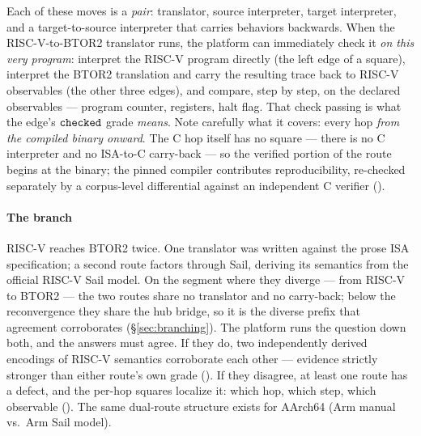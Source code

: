 Each of these moves is a \emph{pair}: translator, source interpreter,
target interpreter, and a target-to-source interpreter that carries
behaviors backwards. When the RISC-V-to-BTOR2 translator runs, the
platform can immediately check it \emph{on this very program}: interpret
the RISC-V program directly (the left edge of a square), interpret the
BTOR2 translation and carry the resulting trace back to RISC-V
observables (the other three edges), and compare, step by step, on the
declared observables --- program counter, registers, halt flag. That
check passing is what the edge's $\mathtt{checked}$ grade \emph{means}. Note
carefully what it covers: every hop \emph{from the compiled binary
onward}. The C hop itself has no square --- there is no C interpreter
and no ISA-to-C carry-back --- so the verified portion of the route
begins at the binary; the pinned compiler contributes reproducibility,
re-checked separately by a corpus-level differential against an
independent C verifier ().

\paragraph{The branch}
RISC-V reaches BTOR2 twice. One translator was written against the prose
ISA specification; a second route factors through Sail, deriving its
semantics from the official RISC-V Sail model. On the segment where they
diverge --- from RISC-V to BTOR2 --- the two routes share no translator
and no carry-back; below the reconvergence they share the hub bridge,
so it is the diverse prefix that agreement corroborates
(\S\ref{sec:branching}). The
platform runs the question down both, and the answers must agree. If they
do, two independently derived encodings of RISC-V semantics corroborate
each other --- evidence strictly stronger than either route's own grade
(). If they disagree, at least one route has a defect,
and the per-hop squares localize it: which hop, which step, which
observable (). The same dual-route
structure exists for AArch64 (Arm manual vs.\ Arm Sail model).

